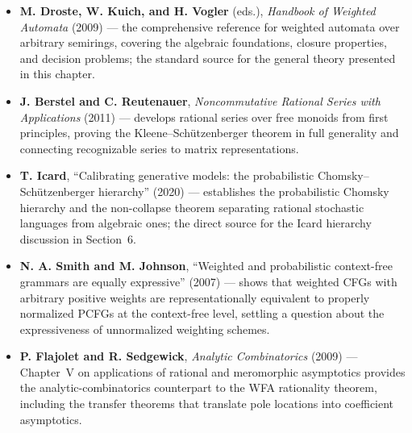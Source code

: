 \begin{itemize}
  \item \textbf{M. Droste, W. Kuich, and H. Vogler} (eds.), \emph{Handbook of Weighted Automata} (2009) \cite{DrosteKuichVogler2009} --- the comprehensive reference for weighted automata over arbitrary semirings, covering the algebraic foundations, closure properties, and decision problems; the standard source for the general theory presented in this chapter.
  \item \textbf{J. Berstel and C. Reutenauer}, \emph{Noncommutative Rational Series with Applications} (2011) \cite{BerstelReutenauer2011} --- develops rational series over free monoids from first principles, proving the Kleene--Schützenberger theorem in full generality and connecting recognizable series to matrix representations.
  \item \textbf{T. Icard}, ``Calibrating generative models: the probabilistic Chomsky--Schützenberger hierarchy'' (2020) \cite{Icard2020} --- establishes the probabilistic Chomsky hierarchy and the non-collapse theorem separating rational stochastic languages from algebraic ones; the direct source for the Icard hierarchy discussion in Section~6.
  \item \textbf{N. A. Smith and M. Johnson}, ``Weighted and probabilistic context-free grammars are equally expressive'' (2007) \cite{SmithJohnson2007} --- shows that weighted CFGs with arbitrary positive weights are representationally equivalent to properly normalized PCFGs at the context-free level, settling a question about the expressiveness of unnormalized weighting schemes.
  \item \textbf{P. Flajolet and R. Sedgewick}, \emph{Analytic Combinatorics} (2009) \cite{FlajoletSedgewick2009} --- Chapter~V on applications of rational and meromorphic asymptotics provides the analytic-combinatorics counterpart to the WFA rationality theorem, including the transfer theorems that translate pole locations into coefficient asymptotics.
\end{itemize}
